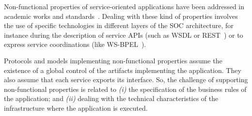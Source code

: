 
Non-functional properties of service-oriented applications have been
addressed in academic works and standards~\cite{ws-co,ws-tra,wsci}.
Dealing with these kind of properties involves the use of specific technologies
in different layers of the SOC architecture, for instance during the description
of service APIs (such as WSDL\cite{wsdl} or REST~\cite{rest}) or to express
service coordinations (like WS-BPEL~\cite{bpel03}).


Protocols and models implementing non-functional properties assume the existence of a global control of the artifacts implementing the application.
They also assume that each service exports its interface.
So, the challenge of supporting non-functional properties is related to
\textit{(i)} the specification of the business rules of the application; and 
\textit{(ii)} dealing with the technical characteristics of the infrastructure where the application is executed.

%


